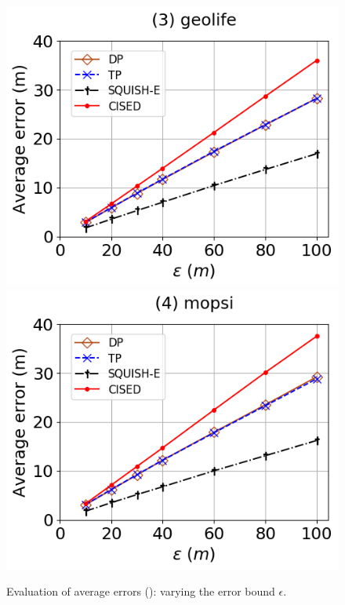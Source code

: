 \begin{figure}[tb!]
	\includegraphics[scale=0.315]{Figures/Exp-SED-error-epsilon-geolife.png}	\hspace{1ex}
	\includegraphics[scale=0.315]{Figures/Exp-SED-error-epsilon-mopsi.png}		
	\vspace{-3ex}
	\caption{\small Evaluation of average errors (\sed): varying the error bound $\epsilon$.}
	\label{fig:ae-sed-epsilon}
	\vspace{-2ex}
\end{figure}

